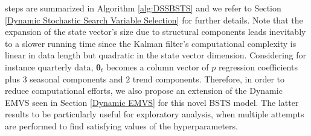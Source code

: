 \documentclass[
  12pt,
]{book}
\theoremstyle{break}
\theoremstyle{nonumberplain}
\begin{document}
steps are summarized in Algorithm \ref{alg:DSSBSTS} and we refer to
Section \ref{Dynamic Stochastic Search Variable Selection} for further
details. Note that the expansion of the state vector's size due to
structural components leads inevitably to a slower running time since
the Kalman filter's computational complexity is linear in data length
but quadratic in the state vector dimension. Considering for instance
quarterly data, \(\boldsymbol{\theta}_{t}\) becomes a column vector of
\(p\) regression coefficients plus \(3\) seasonal components and \(2\)
trend components. Therefore, in order to reduce computational efforts,
we also propose an extension of the Dynamic EMVS seen in Section
\ref{Dynamic EMVS} for this novel BSTS model. The latter results to be
particularly useful for exploratory analysis, when multiple attempts are
performed to find satisfying values of the hyperparameters.
\end{document}

